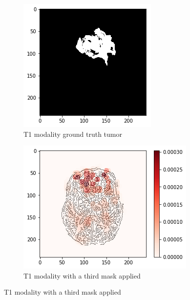 \begin{figure}[H]
\begin{subfigure}[t]{.4\textwidth}
        \includegraphics[width=\linewidth]{chapters/06_hdm/c_Brats18_2013_17_1_L1/40.png}
        \caption{T1 modality ground truth tumor}
    \end{subfigure}
    \begin{subfigure}[t]{.45\textwidth}
        \centering
        \includegraphics[width=\linewidth]{chapters/06_hdm/c_Brats18_2013_17_1_L1/43.png}
        \caption{T1 modality with a third mask applied}
    \end{subfigure}\hspace{1cm}%

\end{figure}
